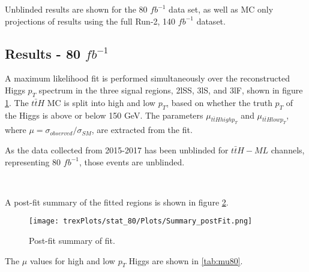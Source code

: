 Unblinded results are shown for the 80 $fb^{-1}$ data set, as well as MC only projections of results using the full Run-2, 140 $fb^{-1}$ dataset.

\subsection{Results - 80 $fb^{-1}$}
\label{sec:res80}

A maximum likelihood fit is performed simultaneously over the reconstructed Higgs $p_T$ spectrum in the three signal regions, 2lSS, 3lS, and 3lF, shown in figure \ref{fig:sigRegions80}. The $t\bar{t}H$ MC is split into high and low $p_T$, based on whether the truth $p_T$ of the Higgs is above or below 150 GeV. The parameters $\mu_{t\bar{t}H high p_T}$ and $\mu_{t\bar{t}H low p_T}$, where $\mu = \sigma_{observed}/\sigma_{SM} $, are extracted from the fit.

As the data collected from 2015-2017 has been unblinded for $t\bar{t}H-ML$ channels, representing 80 $fb^{-1}$, those events are unblinded.

\begin{figure}[h!]
    \\
    \caption{}
    \label{fig:sigRegions80}
\end{figure}

A post-fit summary of the fitted regions is shown in figure \ref{fig:Summary80}.

\begin{figure}[h!]
    \center
    \texttt{[image: trexPlots/stat\_80/Plots/Summary\_postFit.png]}
    \caption{Post-fit summary of fit.}                                                                          
    \label{fig:Summary80}
\end{figure}

The $\mu$ values for high and low $p_T$ Higgs are shown in \ref{tab:mu80}.

